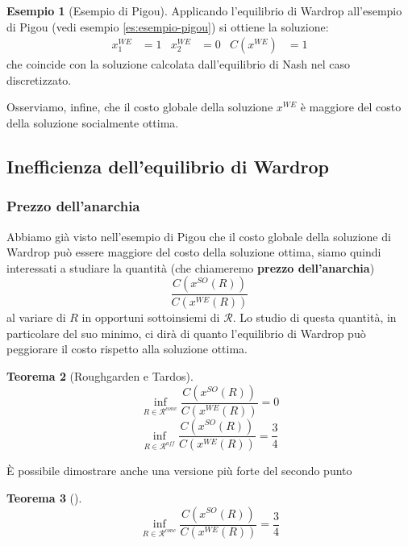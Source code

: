 \documentclass[a4paper]{article}
\theoremstyle{plain}
\newtheorem{myteo}{Teorema}[section]
\theoremstyle{definition}
\newtheorem{myes}[myteo]{Esempio}
\theoremstyle{remark}
\newcommand{\pa}[1]{\left(#1\right)}
\begin{document}
\begin{myes}[Esempio di Pigou]
  Applicando l'equilibrio di Wardrop all'esempio di Pigou (vedi
  esempio \ref{es:esempio-pigou}) si ottiene la soluzione:
  \begin{align*}
    x^{WE}_1 &= 1 & x^{WE}_2 &= 0 & C\pa{x^{WE}} &= 1
  \end{align*}
  che coincide con la soluzione calcolata dall'equilibrio di Nash nel
  caso discretizzato.

  Osserviamo, infine, che il costo globale della soluzione $x^{WE}$ è
  maggiore del costo della soluzione socialmente ottima.
\end{myes}

\subsection{Inefficienza dell'equilibrio di Wardrop}
\label{sec:wardrop-inefficienza}

\subsubsection{Prezzo dell'anarchia}
\label{sec:wardrop-poa}

Abbiamo già visto nell'esempio di Pigou che il costo globale della
soluzione di Wardrop può essere maggiore del costo della soluzione
ottima, siamo quindi interessati a studiare la quantità (che
chiameremo \textbf{prezzo dell'anarchia})
\[ \frac{C\pa{x^{SO}\pa{R}}}{C\pa{x^{WE}\pa{R}}} \]
al variare di $R$ in opportuni sottoinsiemi di $\mathcal{R}$. Lo
studio di questa quantità, in particolare del suo minimo, ci dirà di
quanto l'equilibrio di Wardrop può peggiorare il costo rispetto alla
soluzione ottima.

\begin{myteo}[Roughgarden e Tardos{\cite[Teorema
    4.5]{roughgarden2002}}]
\label{teo:roughgarden-tardos}
  \[ \inf _{R\in \mathcal{R}^{conv}} \frac{C\pa{ x^{SO}\pa{R}}}{C\pa{
        x^{WE}\pa{R}}} = 0 \]
  \[ \inf _{R\in \mathcal{R}^{aff}} \frac{C\pa{ x^{SO}\pa{R}}}{C\pa{
        x^{WE}\pa{R}}} = \frac{3}{4} \]
\end{myteo}

È possibile dimostrare anche una versione più forte del secondo punto
\begin{myteo}[{\cite[Lemma 3.10]{menache2011network}}]
\label{teo:poa-we-conc}
  \[ \inf _{R\in \mathcal{R}^{conc}} \frac{C\pa{ x^{SO}\pa{R}}}{C\pa{
        x^{WE}\pa{R}}} = \frac{3}{4} \]
\end{myteo}
\end{document}
